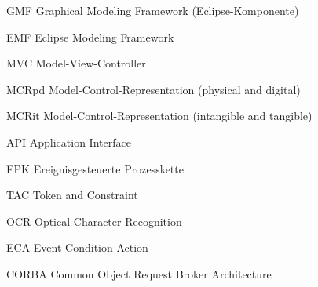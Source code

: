 {GMF}
{Graphical Modeling Framework (Eclipse-Komponente)}

{EMF}
{Eclipse Modeling Framework}

{MVC}
{Model-View-Controller}

{MCRpd}
{Model-Control-Representation (physical and digital)}

{MCRit}
{Model-Control-Representation (intangible and tangible)}

{API}
{Application Interface}

{EPK}
{Ereignisgesteuerte Prozesskette}

{TAC}
{Token and Constraint}

{OCR}
{Optical Character Recognition}

{ECA}
{Event-Condition-Action}

{CORBA}
{Common Object Request Broker Architecture}
